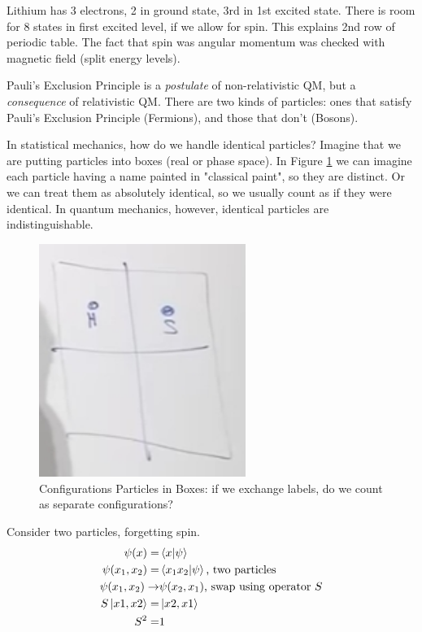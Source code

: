 \documentclass[]{article}
\begin{document}
Lithium has 3 electrons, 2 in ground state, 3rd in 1st excited state. There is room for 8 states in first excited level, if we allow for spin. This explains 2nd row of periodic table. The fact that spin was angular momentum was checked with magnetic field (split energy levels).

Pauli's Exclusion Principle is a \emph{postulate} of non-relativistic QM, but a \emph{consequence} of relativistic QM. There are two kinds of particles: ones that satisfy Pauli's Exclusion Principle (Fermions), and those that don't (Bosons).

In statistical mechanics, how do we handle identical particles? Imagine that we are putting particles into boxes (real or phase space). In Figure \ref{fig:aqm-4-particles-boxen} we can imagine each particle having a name painted in "classical paint", so they are distinct. Or we can treat them as absolutely identical, so we usually count as if they were identical. In quantum mechanics, however, identical  particles are indistinguishable.

\begin{figure}[H]
	\begin{center}
		\caption[Configurations Particles in Boxes]{Configurations Particles in Boxes: if we exchange labels, do we count as separate configurations?}\label{fig:aqm-4-particles-boxen}
		\includegraphics[width=0.6\textwidth]{aqm-4-particles-boxen}
	\end{center}
\end{figure}

Consider two particles, forgetting spin.
\begin{align*}
	\psi(x) =& \braket{x|\psi}\\
	\psi(x_1,x_2) =& \braket{x_1x_2|\psi}\text{, two particles}\\
	\psi(x_1,x_2) \rightarrow & \psi(x_2,x_1)\text{, swap using operator $S$}\\
	S\ket{x1,x2} =& \ket{x2,x1}\\
	S^2 =& 1
\end{align*}
\end{document}
